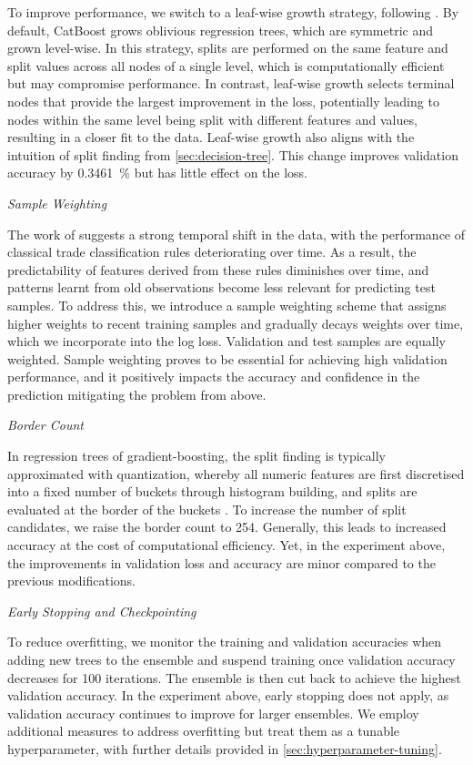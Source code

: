 To improve performance, we switch to a leaf-wise growth strategy, following \textcite[][4]{chenXGBoostScalableTree2016}. By default, CatBoost grows oblivious regression trees, which are symmetric and grown level-wise. In this strategy, splits are performed on the same feature and split values across all nodes of a single level, which is computationally efficient but may compromise performance. In contrast, leaf-wise growth selects terminal nodes that provide the largest improvement in the loss, potentially leading to nodes within the same level being split with different features and values, resulting in a closer fit to the data. Leaf-wise growth also aligns with the intuition of split finding from \cref{sec:decision-tree}. This change improves validation accuracy by \SI{0.3461}{\percent} but has little effect on the loss.

\emph{Sample Weighting}

The work of \textcite[][36--38]{grauerOptionTradeClassification2022} suggests a strong temporal shift in the data, with the performance of classical trade classification rules deteriorating over time.  As a result, the predictability of features derived from these rules diminishes over time, and patterns learnt from old observations become less relevant for predicting test samples. To address this, we introduce a sample weighting scheme that assigns higher weights to recent training samples and gradually decays weights over time, which we incorporate into the log loss. Validation and test samples are equally weighted. Sample weighting proves to be essential for achieving high validation performance, and it positively impacts the accuracy and confidence in the prediction mitigating the problem from above.

\emph{Border Count}

In regression trees of gradient-boosting, the split finding is typically approximated with quantization, whereby all numeric features are first discretised into a fixed number of buckets through histogram building, and splits are evaluated at the border of the buckets \autocite[][2]{keLightGBMHighlyEfficient2017}. To increase the number of split candidates, we raise the border count to \num{254}. Generally, this leads to increased accuracy at the cost of computational efficiency. Yet, in the experiment above, the improvements in validation loss and accuracy are minor compared to the previous modifications.

\emph{Early Stopping and Checkpointing}

To reduce overfitting, we monitor the training and validation accuracies when adding new trees to the ensemble and suspend training once validation accuracy decreases for \num{100} iterations. The ensemble is then cut back to achieve the highest validation accuracy. In the experiment above, early stopping does not apply, as validation accuracy continues to improve for larger ensembles. We employ additional measures to address overfitting but treat them as a tunable hyperparameter, with further details provided in \cref{sec:hyperparameter-tuning}.


